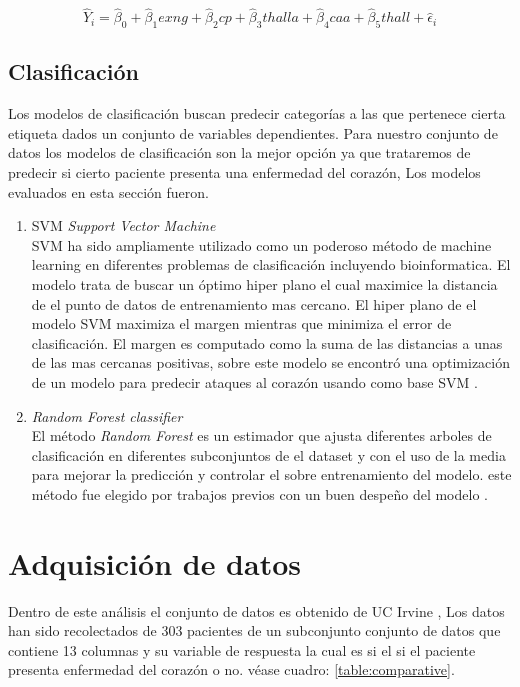 \documentclass[10pt,journal]{IEEEtran}
\begin{document}
\begin{equation}
\hat{Y}_i = \hat{\beta}_0 + \hat{\beta}_1 exng  + \hat{\beta}_2 cp  + \hat{\beta}_3 thalla  + \hat{\beta}_4 caa  + \hat{\beta}_5 thall + \hat{\epsilon}_i
\end{equation}


\subsection{Clasificación}
Los modelos de clasificación buscan predecir categorías a las que pertenece cierta etiqueta dados un conjunto de variables dependientes.
Para nuestro conjunto de datos los modelos de clasificación son la mejor opción ya que trataremos de predecir si cierto paciente presenta una enfermedad del corazón, Los modelos evaluados en esta sección fueron.

\begin{enumerate}
  \item SVM \emph{Support Vector Machine} \\
  SVM ha sido ampliamente utilizado como un poderoso método de machine learning en diferentes problemas de clasificación incluyendo bioinformatica. El modelo trata de buscar un óptimo hiper plano el cual maximice la distancia de el punto de datos de entrenamiento mas cercano. El hiper plano de el modelo SVM maximiza el margen mientras que minimiza el error de clasificación. El margen es computado como la suma de las distancias a unas de las mas cercanas positivas, sobre este modelo se encontró una optimización de un modelo para predecir ataques al corazón usando como base SVM \cite{8684835}.
  \item \emph{Random Forest classifier} \\
       El método \emph{Random Forest} es un estimador que ajusta diferentes arboles de clasificación en diferentes subconjuntos de el dataset y con el uso de la media para mejorar la predicción y controlar el sobre entrenamiento del modelo. este método fue elegido por trabajos previos con un buen despeño del modelo \cite{Pal_2021}.   
\end{enumerate}


\section{Adquisición de datos}
\label{sec:adquisiciondatos}

Dentro de este análisis el conjunto de datos es obtenido de UC Irvine \cite{UCI} , Los datos han sido recolectados de 303 pacientes de un subconjunto conjunto de datos que contiene 13 columnas y su variable de respuesta la cual es si el si el paciente presenta enfermedad del corazón o no. véase cuadro: \ref{table:comparative}.
\end{document}
